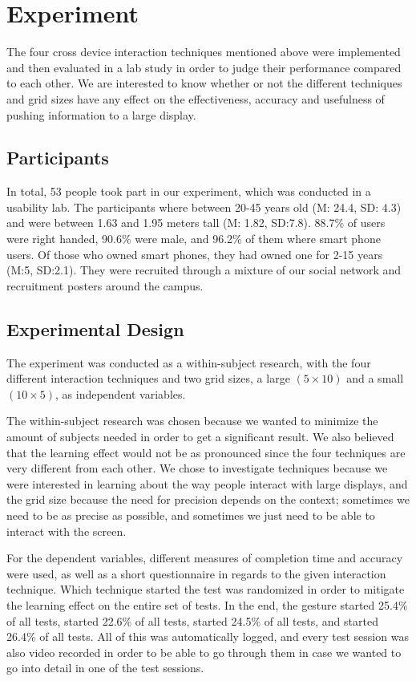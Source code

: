 \section{Experiment} \label{sec:experiment}
The four cross device interaction techniques mentioned above were implemented and then evaluated in a lab study in order to judge their performance compared to each other. We are interested to know whether or not the different techniques and grid sizes have any effect on the effectiveness, accuracy and usefulness of pushing information to a large display. 

\subsection{Participants}
In total, 53 people took part in our experiment, which was conducted in a usability lab. 
The participants where between 20-45 years old (M: 24.4, SD: 4.3) and were between 1.63 and 1.95 meters tall (M: 1.82, SD:7.8). 
88.7\% of users were right handed, 90.6\% were male, and 96.2\% of them where smart phone users. 
Of those who owned smart phones, they had owned one for 2-15 years (M:5, SD:2.1). 
They were recruited through a mixture of our social network and recruitment posters around the campus. 

\subsection{Experimental Design}\label{sec:expdesign}
The experiment was conducted as a within-subject research, with the four different interaction techniques and two grid sizes, a large $(5 \times 10)$ and a small $(10 \times 5)$, as independent variables. 

The within-subject research was chosen because we wanted to minimize the amount of subjects needed in order to get a significant result. We also believed that the learning effect would not be as pronounced since the four techniques are very different from each other. 
We chose to investigate techniques because we were interested in learning about the way people interact with large displays, and the grid size because the need for precision depends on the context; sometimes we need to be as precise as possible, and sometimes we just need to be able to interact with the screen. 

For the dependent variables, different measures of completion time and accuracy were used, as well as a short questionnaire in regards to the given interaction technique. 
Which technique started the test was randomized in order to mitigate the learning effect on the entire set of tests. 
In the end, the \pinch gesture started 25.4\% of all tests, \swipe started 22.6\% of all tests, \throw started 24.5\% of all tests, and \tilt started 26.4\% of all tests. 
All of this was automatically logged, and every test session was also video recorded in order to be able to go through them in case we wanted to go into detail in one of the test sessions.

